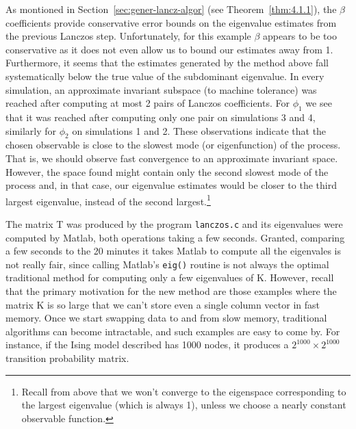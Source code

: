 \documentclass[12pt,letterpaper]{report}
\theoremstyle{plain}
\theoremstyle{definition}
\theoremstyle{remark}
\numberwithin{theorem}{chapter}
\numberwithin{claim}{chapter}
\numberwithin{equation}{chapter}
\numberwithin{conjecture}{chapter}
\newcommand\<{\ensuremath{\langle}}
\renewcommand\>{\ensuremath{\rangle}}
\begin{document}
As montioned in Section~\ref{sec:gener-lancz-algor} (see
Theorem~\ref{thm:4.1.1}), the $\beta$ coefficients provide conservative error 
bounds on the eigenvalue estimates from the previous Lanczos
step. Unfortunately, for this example $\beta$ appears to be too conservative as
it does not even allow us to bound our estimates away from 1. Furthermore, it  
seems that the estimates generated by the method above fall systematically below
the true value of the subdominant eigenvalue. In every simulation, an
approximate invariant subspace (to machine tolerance) was reached after
computing at most 2 pairs of Lanczos coefficients. For $\phi_1$ we see that 
it was reached after computing only one pair on simulations 3 and 4, similarly
for $\phi_2$ on simulations 1 and 2. These observations indicate that the chosen
observable is close to the slowest mode (or 
eigenfunction) of the process. That is, we should observe fast convergence to an approximate
invariant space. However, the space found might contain only the second slowest mode of the
process and, in that case, our eigenvalue estimates would be closer to the third largest eigenvalue,
instead of the second largest.\footnote{Recall from above that we won't
converge to the eigenspace corresponding to the largest eigenvalue 
(which is always 1), unless we choose a nearly constant observable function.}

The matrix T was produced by the program {\tt lanczos.c} and its eigenvalues were computed
by Matlab, both operations taking a few seconds. Granted, comparing a few seconds to the 20
minutes it takes Matlab to compute all the eigenvales is not really fair, 
since calling Matlab's {\tt eig()} routine is not always the
%
%
%
%
optimal traditional method for computing only a few eigenvalues of K. However, recall that
the primary motivation for the new method are those examples where the matrix K is so large
that we can't store even a single column vector in fast memory. Once we start
swapping data to and from slow memory, traditional algorithms can become
intractable, and such examples are easy to come by. For instance, if the Ising
model described has 1000 nodes, it produces a $2^{1000}\times 2^{1000}$
transition probability matrix.
%
%
%
%


\end{document}
